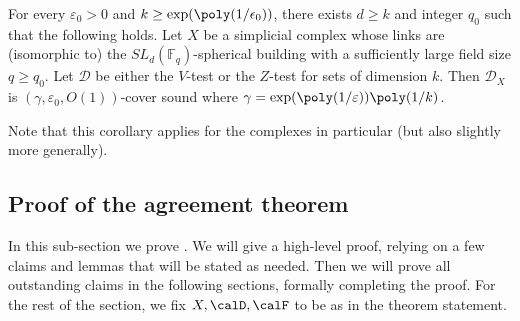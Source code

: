 \begin{corollary} \label{cor:LSV-building-agreement-expansion}
   For every \(\varepsilon_0 > 0\) and \(k \geq \exp(\poly(1/\epsilon_0))\), there exists \(d \geq k\) and integer \(q_0\) such that the following holds. Let \(X\) be a simplicial complex whose links are (isomorphic to)  the \(SL_d(\mathbb{F}_q)\)-spherical building with a sufficiently large field size \(q \geq q_0\). Let \(\mathcal{D}\) be either the \(V\)-test or the \(Z\)-test for sets of dimension \(k\). Then \(\mathcal{D}_X\) is \((\gamma,\varepsilon_0,O(1))\)-cover sound where \(\gamma = \exp(\poly(1/\varepsilon))\poly(1/k)\).
\end{corollary}
Note that this corollary applies for the \cite{LubotzkySV2005b} complexes in particular (but also slightly more generally).

\subsection*{Proof of the agreement theorem}
In this sub-section we prove . We will give a high-level proof, relying on a few claims and lemmas that will be stated as needed. Then we will prove all outstanding claims in the following sections, formally completing the proof. For the rest of the section, we fix \(X,\calD,\calF \) to be as in the theorem statement. 

